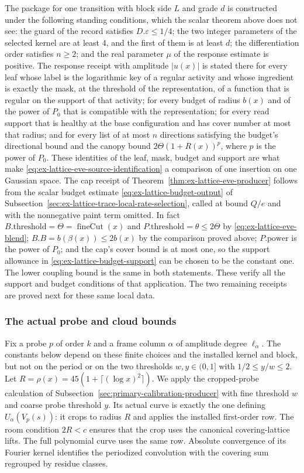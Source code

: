 The package for one transition with block side $L$ and grade $d$ is
constructed under the following standing conditions, which the scalar
theorem above does not see: the guard of the record satisfies
$D.\varepsilon\le1/4$; the two integer parameters of the selected kernel
are at least $4$, and the first of them is at least $d$; the differentiation
order satisfies $n\ge2$; and the real parameter $\mu$ of the response
estimate is positive. The response receipt with amplitude $|u(x)|$ is stated there for
every leaf whose label is the logarithmic key of a regular activity and
whose ingredient is exactly the mask, at the threshold of the
representation, of a function that is regular on the support of that
activity; for every budget of radius $b(x)$ and of the power of $P_0$ that
is compatible with the representation; for every read support that is
healthy at the base configuration and has cover number at most that
radius; and for every list of at most $n$ directions satisfying the
budget's directional bound and the canopy bound
$2\Theta(1+R(x))^{p}$, where $p$ is the power of $P_0$. These identities
of the leaf, mask, budget and support are what make
\eqref{eq:ex-lattice-eve-source-identification} a comparison of one
insertion on one Gaussian space. The cap receipt of
Theorem~\ref{thm:ex-lattice-eve-producer} follows from the scalar budget
estimate \eqref{eq:ex-lattice-budget-output} of
Subsection~\ref{sec:ex-lattice-trace-local-rate-selection}, called
at bound $Q/e$ and with the nonnegative paint term omitted. In fact
$B.\mathrm{threshold}=\Theta=\operatorname{fineCut}(x)$ and
$P.\mathrm{threshold}=\theta\le2\Theta$ by \eqref{eq:ex-lattice-eve-blend};
$B.B=b(\beta(x))\le2b(x)$ by the comparison proved above;
$P.\mathrm{power}$ is the power of $P_0$; and the cap's cover bound
is at most one, so the support allowance in
\eqref{eq:ex-lattice-budget-support} can be chosen to be the constant one.
The lower coupling bound is the same in both statements. These verify
all the support and budget conditions of that application. The two remaining receipts are proved next for these same local data.

\subsubsection{The actual probe and cloud bounds}
\label{subsec:trace-eve-probe-cloud}
Fix a probe $p$ of order $k$ and a frame column $\alpha$ of
amplitude degree $\ell_\alpha$. The constants below depend on these
finite choices and the installed kernel and block, but not on the
period or on the two thresholds $w,y\in(0,1]$ with
$1/2\le y/w\le2$. Let $R=\rho(x)=45(1+\lceil(\log x)^2\rceil)$.
We apply the cropped-probe calculation of
Subsection~\ref{sec:primary-calibration-producer} with fine threshold
$w$ and coarse probe threshold $y$. Its actual curve is exactly the
one defining $U_\alpha(V_p(s))$: it crops to radius $R$ and applies
the installed first-order row. The room condition $2R<c$ ensures
that the crop uses the canonical covering-lattice lifts. The
full polynomial curve uses the same row. Absolute convergence of
its Fourier kernel identifies the periodized convolution with the
covering sum regrouped by residue classes.

